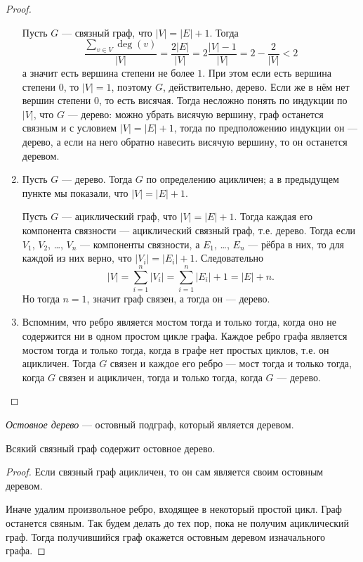 \documentclass[12pt,a4paper]{article}
\begin{document}
\begin{proof}
\begin{enumerate}
            Пусть $G$ --- связный граф, что $|V| = |E| + 1$. Тогда
            \[\frac{\sum_{v \in V} \deg(v)}{|V|} = \frac{2|E|}{|V|} = 2\frac{|V|-1}{|V|} = 2 - \frac{2}{|V|} < 2\]
            а значит есть вершина степени не более $1$. При этом если есть вершина степени $0$, то $|V| = 1$, поэтому $G$, действительно, дерево. Если же в нём нет вершин степени $0$, то есть висячая. Тогда несложно понять по индукции по $|V|$, что $G$ --- дерево: можно убрать висячую вершину, граф останется связным и с условием $|V| = |E| + 1$, тогда по предположению индукции он --- дерево, а если на него обратно навесить висячую вершину, то он останется деревом.

            \item Пусть $G$ --- дерево. Тогда $G$ по определению ацикличен; а в предыдущем пункте мы показали, что $|V| = |E| + 1$.
            
            Пусть $G$ --- ациклический граф, что $|V| = |E| + 1$. Тогда каждая его компонента связности --- ациклический связный граф, т.е. дерево. Тогда если $V_1$, $V_2$, \dots, $V_n$ --- компоненты связности, а $E_1$, \dots, $E_n$ --- рёбра в них, то для каждой из них верно, что $|V_i| = |E_i| + 1$. Следовательно
            \[|V| = \sum_{i=1}^n |V_i| = \sum_{i=1}^n |E_i| + 1 = |E| + n.\]
            Но тогда $n=1$, значит граф связен, а тогда он --- дерево.

            \item Вспомним, что ребро является мостом тогда и только тогда, когда оно не содержится ни в одном простом цикле графа. Каждое ребро графа является мостом тогда и только тогда, когда в графе нет простых циклов, т.е. он ацикличен. Тогда $G$ связен и каждое его ребро --- мост тогда и только тогда, когда $G$ связен и ацикличен, тогда и только тогда, когда $G$ --- дерево.
        \end{enumerate}
    \end{proof}

    \begin{definition}
        \emph{Остовное дерево} --- остовный подграф, который является деревом.
    \end{definition}

    \begin{lemma}
        Всякий связный граф содержит остовное дерево.
    \end{lemma}

    \begin{proof}
        Если связный граф ацикличен, то он сам является своим остовным деревом.

        Иначе удалим произвольное ребро, входящее в некоторый простой цикл. Граф останется свяным. Так будем делать до тех пор, пока не получим ациклический граф. Тогда получившийся граф окажется остовным деревом изначального графа.
    \end{proof}
\end{document}
